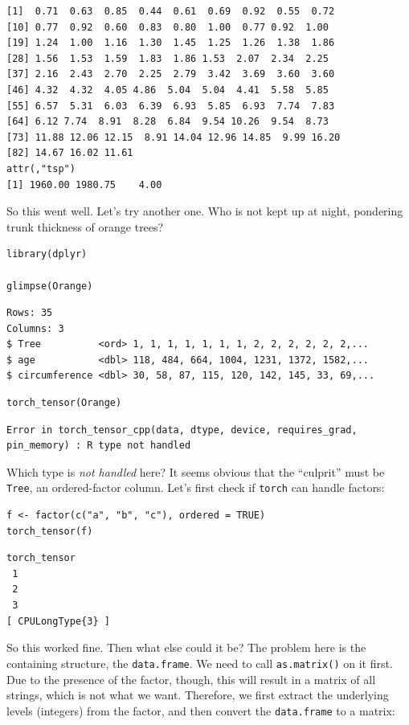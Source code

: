 \documentclass[
  letterpaper,
]{krantz}
\begin{document}
\begin{verbatim}
[1]  0.71  0.63  0.85  0.44  0.61  0.69  0.92  0.55  0.72
[10] 0.77  0.92  0.60  0.83  0.80  1.00  0.77 0.92  1.00
[19] 1.24  1.00  1.16  1.30  1.45  1.25  1.26  1.38  1.86
[28] 1.56  1.53  1.59  1.83  1.86 1.53  2.07  2.34  2.25
[37] 2.16  2.43  2.70  2.25  2.79  3.42  3.69  3.60  3.60
[46] 4.32  4.32  4.05 4.86  5.04  5.04  4.41  5.58  5.85
[55] 6.57  5.31  6.03  6.39  6.93  5.85  6.93  7.74  7.83
[64] 6.12 7.74  8.91  8.28  6.84  9.54 10.26  9.54  8.73
[73] 11.88 12.06 12.15  8.91 14.04 12.96 14.85  9.99 16.20
[82] 14.67 16.02 11.61 
attr(,"tsp")
[1] 1960.00 1980.75    4.00
\end{verbatim}

So this went well. Let's try another one. Who is not kept up at night,
pondering trunk thickness of orange trees?

\begin{verbatim}
library(dplyr)

glimpse(Orange)
\end{verbatim}

\begin{verbatim}
Rows: 35
Columns: 3
$ Tree          <ord> 1, 1, 1, 1, 1, 1, 1, 2, 2, 2, 2, 2, 2,...
$ age           <dbl> 118, 484, 664, 1004, 1231, 1372, 1582,...
$ circumference <dbl> 30, 58, 87, 115, 120, 142, 145, 33, 69,...
\end{verbatim}

\begin{verbatim}
torch_tensor(Orange)
\end{verbatim}

\begin{verbatim}
Error in torch_tensor_cpp(data, dtype, device, requires_grad,
pin_memory) : R type not handled
\end{verbatim}

Which type is \emph{not handled} here? It seems obvious that the
``culprit'' must be \texttt{Tree}, an ordered-factor column. Let's first
check if \texttt{torch} can handle factors:

\begin{verbatim}
f <- factor(c("a", "b", "c"), ordered = TRUE)
torch_tensor(f)
\end{verbatim}

\begin{verbatim}
torch_tensor
 1
 2
 3
[ CPULongType{3} ]
\end{verbatim}

So this worked fine. Then what else could it be? The problem here is the
containing structure, the \texttt{data.frame}. We need to call
\texttt{as.matrix()} on it first. Due to the presence of the factor,
though, this will result in a matrix of all strings, which is not what
we want. Therefore, we first extract the underlying levels (integers)
from the factor, and then convert the \texttt{data.frame} to a matrix:
\end{document}

